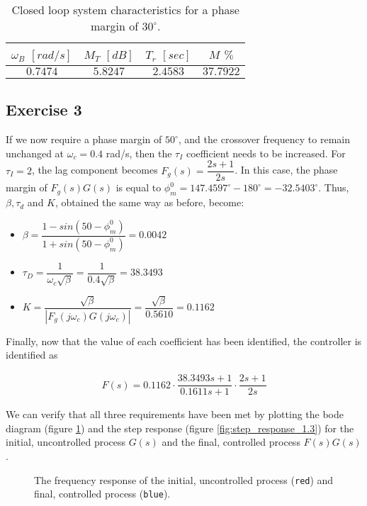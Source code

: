 \begin{table}[H] \centering
    \begin{tabular}{|c|c|c|c|} \hline
      $\omega_B$ $[rad/s]$ & $M_T$ $[dB]$ & $T_r$ $[sec]$ & $M$ $\%$  \\ \hline
      $0.7474$             & $5.8247$     & $2.4583$      & $37.7922$ \\ \hline
    \end{tabular}
    \caption{Closed loop system characteristics for a phase margin of
      $30^{\circ}$.}
    \label{tbl:ex1.2}
\end{table}

\subsection{Exercise 3}

If we now require a phase margin of $50^{\circ}$, and the crossover frequency
to remain unchanged at $\omega_c = 0.4$ rad/s, then the $\tau_I$ coefficient
needs to be increased. For $\tau_I = 2$, the lag component becomes
$F_g(s) = \dfrac{2s + 1}{2s}$. In this case, the phase margin of $F_g(s)G(s)$
is equal to $\phi_m^0 = 147.4597^{\circ} - 180^{\circ} = -32.5403^{\circ}$. Thus,
$\beta, \tau_d$ and $K$, obtained the same way as before, become:

\begin{itemize}
  \item $\beta = \dfrac{1 - sin(50 - \phi_m^0)}{1 + sin(50 - \phi_m^0)} = 0.0042$
  \item $\tau_D = \dfrac{1}{\omega_c\sqrt\beta} = \dfrac{1}{0.4\sqrt\beta} = 38.3493$
  \item $K = \dfrac{\sqrt\beta}{|F_g(j\omega_c)G(j\omega_c)|} =
    \dfrac{\sqrt\beta}{0.5610} = 0.1162$
\end{itemize}

Finally, now that the value of each coefficient has been identified, the
controller is identified as

\begin{align*}
  F(s) = 0.1162 \cdot \dfrac{38.3493 s + 1}{0.1611 s + 1} \cdot \dfrac{2s + 1}{2s}
\end{align*}

We can verify that all three requirements have been met by plotting the bode
diagram (figure \ref{fig:bode_1.3}) and the step response
(figure \ref{fig:step_response_1.3}) for the initial, uncontrolled process $G(s)$
and the final, controlled process $F(s)G(s)$.


\begin{figure}[H]\centering
  \scalebox{1}{}
  \caption{The frequency response of the initial, uncontrolled process
    (\texttt{red}) and final, controlled process (\texttt{blue}).}
  \label{fig:bode_1.3}
\end{figure}

